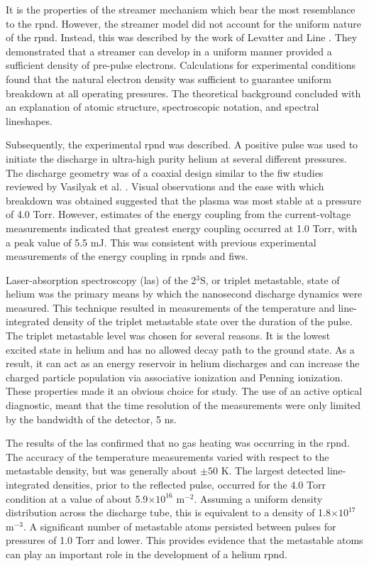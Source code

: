 It is the properties of the streamer mechanism which bear the most resemblance
to the \acs{rpnd}. However, the streamer model did not account for the uniform
nature of the \acs{rpnd}. Instead, this was described by the work of Levatter
and Line \cite{Levatter1980}. They demonstrated that a streamer can develop in a
uniform manner provided a sufficient density of pre-pulse electrons.
Calculations for experimental conditions found that the natural electron density
was sufficient to guarantee uniform breakdown at all operating pressures. The
theoretical background concluded with an explanation of atomic structure,
spectroscopic notation, and spectral lineshapes.

Subsequently, the experimental \acs{rpnd} was described. A positive pulse was
used to initiate the discharge in ultra-high purity helium at several different
pressures. The discharge geometry was of a coaxial design similar to the \acs{fiw}
studies reviewed by Vasilyak et al. \cite{Vasilyak1994}. Visual observations and
the ease with which breakdown was obtained suggested that the plasma was most
stable at a pressure of 4.0 Torr. However, estimates of the energy coupling from
the current-voltage measurements indicated that greatest energy coupling
occurred at 1.0 Torr, with a peak value of 5.5 mJ. This was consistent with
previous experimental measurements of the energy coupling in \acs{rpnd}s and
\acs{fiw}s.

Laser-absorption spectroscopy (\acs{las}) of the 2$^3$S, or triplet metastable,
state of helium was the primary means by which the nanosecond discharge dynamics
were measured. This technique resulted in measurements of the temperature and
line-integrated density of the triplet metastable state over the duration of the
pulse. The triplet metastable level was chosen for several reasons. It is the
lowest excited state in helium and has no allowed decay path to the ground
state. As a result, it can act as an energy reservoir in helium discharges and
can increase the charged particle population via associative ionization and
Penning ionization. These properties made it an obvious choice for study. The
use of an active optical diagnostic, meant that the time resolution of the
measurements were only limited by the bandwidth of the detector, 5 ns.

The results of the \acs{las} confirmed that no gas heating was occurring in the
\acs{rpnd}. The accuracy of the temperature measurements varied with respect to
the metastable density, but was generally about $\pm50$ K. The largest detected
line-integrated densities, prior to the reflected pulse, occurred for the 4.0
Torr condition at a value of about 5.9$\times10^{16}$ m$^{-2}$. Assuming a
uniform density distribution across the discharge tube, this is equivalent to a
density of 1.8$\times10^{17}$ m$^{-3}$. A significant number of metastable atoms
persisted between pulses for pressures of 1.0 Torr and lower. This provides
evidence that the metastable atoms can play an important role in the development
of a helium \acs{rpnd}.


